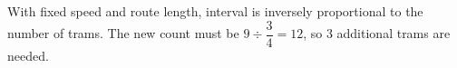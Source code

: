 With fixed speed and route length, interval is inversely proportional to the number of trams. The new count must be $9\div\dfrac{3}{4}=12$, so $\boxed3$ additional trams are needed.
